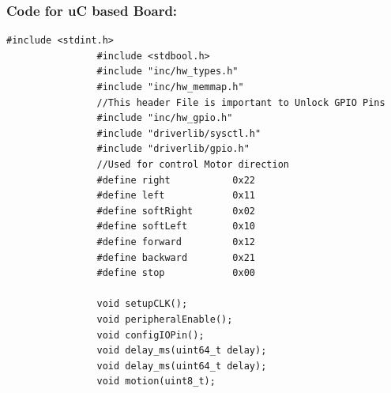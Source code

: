 \documentclass[a4paper,10pt,oneside]{article}
\begin{document}
			\subsubsection{\textbf{Code for uC based Board:}}
			\begin{lstlisting}[style=CStyle]
				#include <stdint.h>
				#include <stdbool.h>
				#include "inc/hw_types.h"
				#include "inc/hw_memmap.h"
				//This header File is important to Unlock GPIO Pins
				#include "inc/hw_gpio.h"
				#include "driverlib/sysctl.h"
				#include "driverlib/gpio.h"	
				//Used for control Motor direction
				#define right           0x22
				#define left            0x11
				#define softRight       0x02
				#define softLeft        0x10
				#define forward         0x12
				#define backward        0x21
				#define stop            0x00
			
				void setupCLK();
				void peripheralEnable();
				void configIOPin();
				void delay_ms(uint64_t delay);
				void delay_ms(uint64_t delay);
				void motion(uint8_t);
				

\end{lstlisting}
\end{document}
